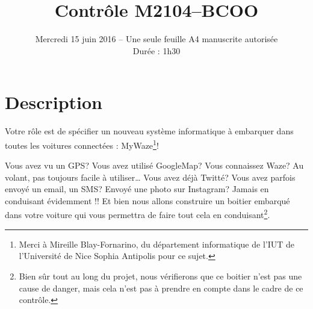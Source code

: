 \documentclass[12pt,French]{article}
\title{\vspace{-3pc}\textbf{Contr\^ole M2104--BCOO}}
\date{Mercredi 15 juin 2016 -- Une seule feuille A4 manuscrite autoris\'ee\\
Dur\'ee : 1h30}
\begin{document}
\maketitle

\section*{Description}

Votre rôle est de spécifier un nouveau système informatique à embarquer dans toutes les  voitures connectées : MyWaze\footnote{Merci à Mireille Blay-Fornarino, du département informatique de l'IUT de l'Université de Nice Sophia Antipolis pour ce sujet.}!

Vous avez vu un GPS? Vous avez utilisé GoogleMap? Vous connaissez Waze? Au volant, pas  toujours facile à utiliser\ldots{} 
Vous avez déjà Twitté? Vous avez parfois envoyé un email, un SMS?  Envoyé une photo sur Instagram? 
Jamais en conduisant évidemment !! 
Et bien nous allons  construire un boitier embarqué dans votre voiture qui vous permettra de faire tout cela en  conduisant\footnote{Bien sûr tout au long du projet, nous vérifierons que ce boitier n'est pas une cause de danger, mais cela  n'est pas à prendre en compte dans le cadre de ce contrôle.}.
\end{document}
